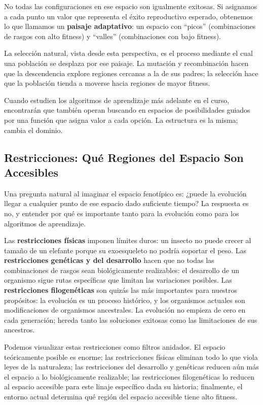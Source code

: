 \documentclass[
  letterpaper,
  DIV=11,
  numbers=noendperiod]{scrreprt}
\begin{document}
No todas las configuraciones en ese espacio son igualmente exitosas. Si
asignamos a cada punto un valor que representa el éxito reproductivo
esperado, obtenemos lo que llamamos un \textbf{paisaje adaptativo}: un
espacio con ``picos'' (combinaciones de rasgos con alto fitness) y
``valles'' (combinaciones con bajo fitness).

La selección natural, vista desde esta perspectiva, es el proceso
mediante el cual una población se desplaza por ese paisaje. La mutación
y recombinación hacen que la descendencia explore regiones cercanas a la
de sus padres; la selección hace que la población tienda a moverse hacia
regiones de mayor fitness.

Cuando estudien los algoritmos de aprendizaje más adelante en el curso,
encontrarán que también operan buscando en espacios de posibilidades
guiados por una función que asigna valor a cada opción. La estructura es
la misma; cambia el dominio.

\subsection{Restricciones: Qué Regiones del Espacio Son
Accesibles}\label{restricciones-quuxe9-regiones-del-espacio-son-accesibles}

Una pregunta natural al imaginar el espacio fenotípico es: ¿puede la
evolución llegar a cualquier punto de ese espacio dado suficiente
tiempo? La respuesta es no, y entender por qué es importante tanto para
la evolución como para los algoritmos de aprendizaje.

Las \textbf{restricciones físicas} imponen límites duros: un insecto no
puede crecer al tamaño de un elefante porque su exoesqueleto no podría
soportar el peso. Las \textbf{restricciones genéticas y del desarrollo}
hacen que no todas las combinaciones de rasgos sean biológicamente
realizables: el desarrollo de un organismo sigue rutas específicas que
limitan las variaciones posibles. Las \textbf{restricciones
filogenéticas} son quizás las más importantes para nuestros propósitos:
la evolución es un proceso histórico, y los organismos actuales son
modificaciones de organismos ancestrales. La evolución no empieza de
cero en cada generación; hereda tanto las soluciones exitosas como las
limitaciones de sus ancestros.

Podemos visualizar estas restricciones como filtros anidados. El espacio
teóricamente posible es enorme; las restricciones físicas eliminan todo
lo que viola leyes de la naturaleza; las restricciones del desarrollo y
genéticas reducen aún más el espacio a lo biológicamente realizable; las
restricciones filogenéticas lo reducen al espacio accesible para este
linaje específico dada su historia; finalmente, el entorno actual
determina qué región del espacio accesible tiene alto fitness.
\end{document}
